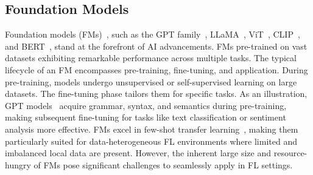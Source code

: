 \subsection{Foundation Models}
Foundation models (FMs)~\citep{Bommasani2021FoundationModels}, such as the GPT family~\citep{brown2020gpt3,radford2019gpt2}, LLaMA~\cite{touvron2023llama2}, ViT~\citep{dosovitskiy2020vit}, CLIP~\citep{radford2021clip}, and BERT~\citep{kenton2019bert}, stand at the forefront of AI advancements. FMs pre-trained on vast datasets exhibiting remarkable performance across multiple tasks.
The typical lifecycle of an FM encompasses pre-training, fine-tuning, and application. During pre-training, models undergo unsupervised or self-supervised learning on large datasets. The fine-tuning phase tailors them for specific tasks. As an illustration, GPT models~\citep{brown2020gpt3,radford2019gpt2,openai2023gpt4} acquire grammar, syntax, and semantics during pre-training, making subsequent fine-tuning for tasks like text classification or sentiment analysis more effective.
FMs excel in few-shot transfer learning~\citep{brown2020llm-fewshot}, making them particularly suited for data-heterogeneous FL environments where limited and imbalanced local data are present. However, the inherent large size and resource-hungry of FMs pose significant challenges to seamlessly apply in FL settings.
















